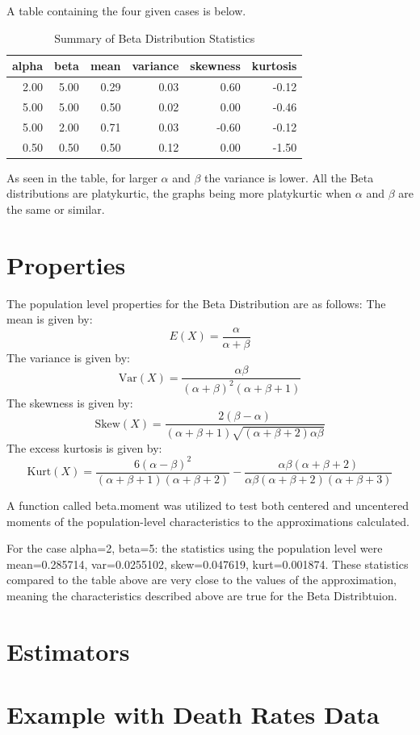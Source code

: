 \documentclass{article}\usepackage[]{graphicx}\usepackage[]{xcolor}
\begin{document}
\begin{multicols}{2}
A table containing the four given cases is below.


\begin{table}[H]
\centering
\begingroup\small
\begin{tabular}{rrrrrr}
  \hline
alpha & beta & mean & variance & skewness & kurtosis \\ 
  \hline
2.00 & 5.00 & 0.29 & 0.03 & 0.60 & -0.12 \\ 
  5.00 & 5.00 & 0.50 & 0.02 & 0.00 & -0.46 \\ 
  5.00 & 2.00 & 0.71 & 0.03 & -0.60 & -0.12 \\ 
  0.50 & 0.50 & 0.50 & 0.12 & 0.00 & -1.50 \\ 
   \hline
\end{tabular}
\endgroup
\caption{Summary of Beta Distribution Statistics} 
\end{table}

As seen in the table, for larger \(\alpha\) and \(\beta\) the variance is lower. All the Beta distributions are platykurtic, the graphs being more platykurtic when \(\alpha\) and \(\beta\) are the same or similar. 

\section{Properties}
The population level properties for the Beta Distribution are as follows:
The mean is given by:
\[
E(X) = \frac{\alpha}{\alpha + \beta}
\]
The variance is given by:
\[
\text{Var}(X) = \frac{\alpha \beta}{(\alpha + \beta)^2 (\alpha + \beta + 1)}
\]
The skewness is given by:
\[
\text{Skew}(X) = \frac{2(\beta - \alpha)}{(\alpha + \beta + 1)\sqrt{(\alpha + \beta + 2)\alpha \beta}}
\]
The excess kurtosis is given by:
\[
\text{Kurt}(X) = \frac{6(\alpha - \beta)^2}{(\alpha + \beta + 1)\left(\alpha + \beta + 2\right)} - \frac{\alpha \beta (\alpha + \beta + 2)}{\alpha \beta (\alpha + \beta + 2)(\alpha + \beta + 3)}
\]

A function called beta.moment was utilized to test both centered and uncentered moments of the population-level characteristics to the approximations calculated. 

For the case alpha=2, beta=5: the statistics using the population level were mean=0.285714, var=0.0255102, skew=0.047619, kurt=0.001874.
These statistics compared to the table above are very close to the values of the approximation, meaning the characteristics described above are true for the Beta Distribtuion.

\section{Estimators}

\section{Example with Death Rates Data}

\begin{tiny}

\end{tiny}
\end{multicols}
\end{document}
